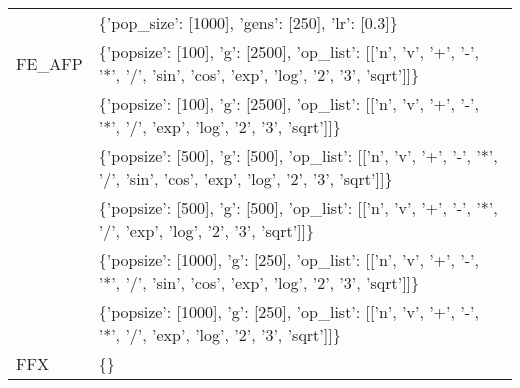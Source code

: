 \begin{tabular}{l p{37em}}
              &                                                                                                                                                                                                                                                                 \{'pop\_size': [1000], 'gens': [250], 'lr': [0.3]\} \\
       FE\_AFP &                                                                                                                                                                                       \{'popsize': [100], 'g': [2500], 'op\_list': [['n', 'v', '+', '-', '*', '/', 'sin', 'cos', 'exp', 'log', '2', '3', 'sqrt']]\} \\
              &                                                                                                                                                                                                     \{'popsize': [100], 'g': [2500], 'op\_list': [['n', 'v', '+', '-', '*', '/', 'exp', 'log', '2', '3', 'sqrt']]\} \\
              &                                                                                                                                                                                        \{'popsize': [500], 'g': [500], 'op\_list': [['n', 'v', '+', '-', '*', '/', 'sin', 'cos', 'exp', 'log', '2', '3', 'sqrt']]\} \\
              &                                                                                                                                                                                                      \{'popsize': [500], 'g': [500], 'op\_list': [['n', 'v', '+', '-', '*', '/', 'exp', 'log', '2', '3', 'sqrt']]\} \\
              &                                                                                                                                                                                       \{'popsize': [1000], 'g': [250], 'op\_list': [['n', 'v', '+', '-', '*', '/', 'sin', 'cos', 'exp', 'log', '2', '3', 'sqrt']]\} \\
              &                                                                                                                                                                                                     \{'popsize': [1000], 'g': [250], 'op\_list': [['n', 'v', '+', '-', '*', '/', 'exp', 'log', '2', '3', 'sqrt']]\} \\
          FFX &                                                                                                                                                                                                                                                                                                               \{\} \\

\end{tabular}
